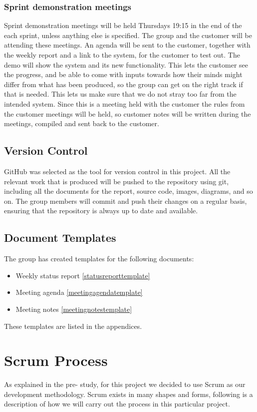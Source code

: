 \subsubsection{Sprint demonstration meetings}
Sprint demonstration meetings will be held Thursdays 19:15 in the end of the each sprint, unless anything else is specified. The group and the customer will be attending these meetings. An agenda will be sent to the customer, together with the weekly report and a link to the system, for the customer to test out. The demo will show the system and its new functionality. This lets the customer see the progress, and be able to come with inputs towards how their minds might differ from what has been produced, so the group can get on the right track if that is needed. This lets us make sure that we do not stray too far from the intended system. Since this is a meeting held with the customer the rules from the customer meetings will be held, so customer notes will be written during the meetings, compiled and sent back to the customer.

\subsection{Version Control}
GitHub was selected as the tool for version control in this project. All the relevant work that is produced will be pushed to the repository using git, including all the documents for the report, source code, images, diagrams, and so on. The group members will commit and push their changes on a regular basis, ensuring that the repository is always up to date and available.

\subsection{Document Templates}
The group has created templates for the following documents:

\begin{itemize}
\item Weekly status report \ref{statusreporttemplate}
\item Meeting agenda \ref{meetingagendatemplate}
\item Meeting notes \ref{meetingnotestemplate}
\end{itemize}

These templates are listed in the appendices.

\section{Scrum Process}
As explained in the pre- study, for this project we decided to use Scrum as our development methodology.  Scrum exists in many shapes and forms, following is a description of how we will carry out the process in this particular project.

